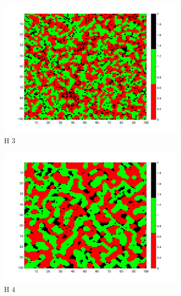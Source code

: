 \documentclass[unicode,11pt,a4paper,oneside,numbers=endperiod,openany]{scrartcl}
\begin{document}
\begin{figure}[H]
\begin{subfigure}[b]{0.3\textwidth}
        \includegraphics[width=\textwidth]{results/iterations_64_H_3_random_1.png}
        \caption{H 3}
        \label{fig:image3}
      \end{subfigure}
      \begin{subfigure}[b]{0.3\textwidth}
        \includegraphics[width=\textwidth]{results/iterations_196_H_4_random_1.png}
        \caption{H 4}
        \label{fig:image4}
      \end{subfigure}
      \begin{subfigure}[b]{0.3\textwidth}

\end{subfigure}
\end{figure}
\end{document}
